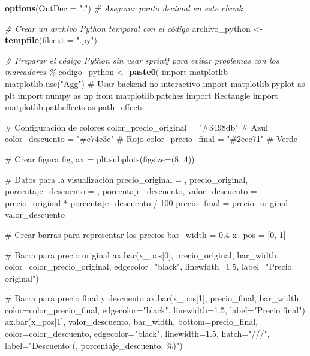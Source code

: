 \documentclass[
]{article}
\newenvironment{Shaded}{\begin{snugshade}}{\end{snugshade}}
\newcommand{\AttributeTok}[1]{\textcolor[rgb]{0.13,0.29,0.53}{#1}}
\newcommand{\CommentTok}[1]{\textcolor[rgb]{0.56,0.35,0.01}{\textit{#1}}}
\newcommand{\FunctionTok}[1]{\textcolor[rgb]{0.13,0.29,0.53}{\textbf{#1}}}
\newcommand{\NormalTok}[1]{#1}
\newcommand{\OtherTok}[1]{\textcolor[rgb]{0.56,0.35,0.01}{#1}}
\newcommand{\StringTok}[1]{\textcolor[rgb]{0.31,0.60,0.02}{#1}}
\begin{document}
\begin{Shaded}
\begin{Highlighting}[]
\FunctionTok{options}\NormalTok{(}\AttributeTok{OutDec =} \StringTok{"."}\NormalTok{)  }\CommentTok{\# Asegurar punto decimal en este chunk}

\CommentTok{\# Crear un archivo Python temporal con el código}
\NormalTok{archivo\_python }\OtherTok{\textless{}{-}} \FunctionTok{tempfile}\NormalTok{(}\AttributeTok{fileext =} \StringTok{".py"}\NormalTok{)}

\CommentTok{\# Preparar el código Python sin usar sprintf para evitar problemas con los marcadores \%}
\NormalTok{codigo\_python }\OtherTok{\textless{}{-}} \FunctionTok{paste0}\NormalTok{(}\StringTok{\textquotesingle{}}
\StringTok{import matplotlib}
\StringTok{matplotlib.use("Agg")  \# Usar backend no interactivo}
\StringTok{import matplotlib.pyplot as plt}
\StringTok{import numpy as np}
\StringTok{from matplotlib.patches import Rectangle}
\StringTok{import matplotlib.patheffects as path\_effects}

\StringTok{\# Configuración de colores}
\StringTok{color\_precio\_original = "\#3498db"  \# Azul}
\StringTok{color\_descuento = "\#e74c3c"        \# Rojo}
\StringTok{color\_precio\_final = "\#2ecc71"     \# Verde}

\StringTok{\# Crear figura}
\StringTok{fig, ax = plt.subplots(figsize=(8, 4))}

\StringTok{\# Datos para la visualización}
\StringTok{precio\_original = \textquotesingle{}}\NormalTok{, precio\_original, }\StringTok{\textquotesingle{}}
\StringTok{porcentaje\_descuento = \textquotesingle{}}\NormalTok{, porcentaje\_descuento, }\StringTok{\textquotesingle{}}
\StringTok{valor\_descuento = precio\_original * porcentaje\_descuento / 100}
\StringTok{precio\_final = precio\_original {-} valor\_descuento}

\StringTok{\# Crear barras para representar los precios}
\StringTok{bar\_width = 0.4}
\StringTok{x\_pos = [0, 1]}

\StringTok{\# Barra para precio original}
\StringTok{ax.bar(x\_pos[0], precio\_original, bar\_width, color=color\_precio\_original,}
\StringTok{       edgecolor="black", linewidth=1.5, label="Precio original")}

\StringTok{\# Barra para precio final y descuento}
\StringTok{ax.bar(x\_pos[1], precio\_final, bar\_width, color=color\_precio\_final,}
\StringTok{       edgecolor="black", linewidth=1.5, label="Precio final")}
\StringTok{ax.bar(x\_pos[1], valor\_descuento, bar\_width, bottom=precio\_final,}
\StringTok{       color=color\_descuento, edgecolor="black", linewidth=1.5,}
\StringTok{       hatch="///", label="Descuento (\textquotesingle{}}\NormalTok{, porcentaje\_descuento, }\StringTok{\textquotesingle{}\%)")}


\end{Highlighting}
\end{Shaded}
\end{document}
